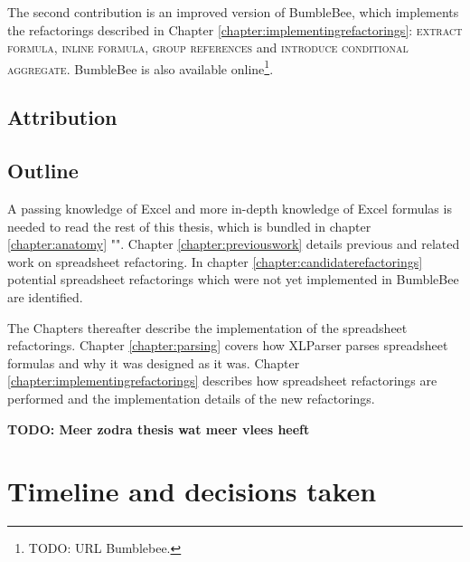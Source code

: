 \documentclass[12pt,a4paper,onecolumn,oneside,parskip]{memoir}
\newcommand{\todo}[1]{\textbf{TODO: #1}}
\newcommand{\rf}[1]{\textsc{\lowercase{#1}}}
\begin{document}
The second contribution is an improved version of BumbleBee, which implements the refactorings described in Chapter \ref{chapter:implementingrefactorings}: \rf{Extract Formula}, \rf{Inline Formula}, \rf{Group References} and \rf{Introduce Conditional Aggregate}.
BumbleBee is also available online\footnote{TODO: URL Bumblebee.}.

\subsection{Attribution}

\subsection{Outline}

A passing knowledge of Excel and more in-depth knowledge of Excel formulas is needed to read the rest of this thesis, which is bundled in chapter \ref{chapter:anatomy} "".
Chapter \ref{chapter:previouswork} details previous and related work on spreadsheet refactoring.
In chapter \ref{chapter:candidaterefactorings} potential spreadsheet refactorings which were not yet implemented in BumbleBee are identified.

The Chapters thereafter describe the implementation of the spreadsheet refactorings.
Chapter \ref{chapter:parsing} covers how XLParser parses spreadsheet formulas and why it was designed as it was.
Chapter \ref{chapter:implementingrefactorings} describes how spreadsheet refactorings are performed and the implementation details of the new refactorings.

\todo{Meer zodra thesis wat meer vlees heeft}

\clearpage
\section{Timeline and decisions taken}
\end{document}

